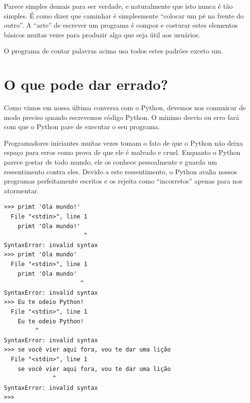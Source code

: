 Parece simples demais para ser verdade, e naturalmente que isto nunca
é tão simples. É como dizer que caminhar é simplesmente ``colocar
um pé na frente do outro''. A ``arte'' de escrever um programa é
compor e costurar estes elementos básicos muitas vezes para produzir
algo que seja útil aos usuários.
%

O programa de contar palavras acima usa todos estes padrões exceto um.
%

\section{O que pode dar errado?}
%

Como vimos em nossa última conversa com o Python, devemos nos comunicar
de modo preciso quando escrevemos código Python. O mínimo desvio ou erro
fará com que o Python pare de executar o seu programa.
%

Programadores iniciantes muitas vezes tomam o fato de que o Python não deixa
espaço para erros como prova de que ele é malvado e cruel.
Enquanto o Python parece gostar de todo mundo, ele os conhece pessoalmente e
guarda um ressentimento contra eles. Devido a este ressentimento, o Python avalia nossos programas perfeitamente escritos e os rejeita como ``incorretos''
apenas para nos atormentar.
%

\beforeverb
\begin{verbatim}
>>> primt 'Ola mundo!'
  File "<stdin>", line 1
    primt 'Ola mundo!'
                       ^
SyntaxError: invalid syntax
>>> primt 'Ola mundo'
  File "<stdin>", line 1
    primt 'Ola mundo'
                      ^
SyntaxError: invalid syntax
>>> Eu te odeio Python!
  File "<stdin>", line 1
    Eu te odeio Python!
         ^
SyntaxError: invalid syntax
>>> se você vier aqui fora, vou te dar uma lição
  File "<stdin>", line 1
    se você vier aqui fora, vou te dar uma lição
              ^
SyntaxError: invalid syntax
>>>
\end{verbatim}
\afterverb


